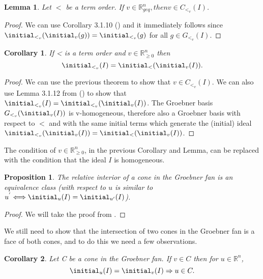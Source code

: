 \documentclass[12pt,a4paper]{report}
\newtheorem{corollary}{Corollary}
\newtheorem{lemma}{Lemma}
\newtheorem{proposition}{Proposition}
\begin{document}
\begin{lemma}
Let $<$ be a term order. If $v \in \mathbb{R}_{geq}^{n}, then v \in C_{{<}_{v}} (I)$.
\end{lemma}


\begin{proof}
We can use Corollary 3.1.10 (\cite{AndersPHD}) and it immediately follows since $\initial_{{<}_{v}} (\initial_{v} (g)) = \initial_{{<}_{v}} (g)$ for all $g \in G_{{<}_{v}} (I)$.
\end{proof}

\begin{corollary}
If < is a term order and $v \in \mathbb{R}_{\geq 0} ^{n}$ then
\begin{equation*}
    \initial_{{<}_{v}} (I) = \initial_{<} (\initial_{v} (I)).
\end{equation*}
\end{corollary}

\begin{proof}
We can use the previous theorem to show that $v \in C_{{<}_{v}} (I)$. We can also use Lemma 3.1.12 from (\cite{AndersPHD}) to show that $\initial_{{<}_{v}} (I) = \initial_{{<}_{v}} (\initial_{v} (I))$. The Groebner basis $G_{{<}_{v}} (\initial_{v}(I))$ is v-homogeneous, therefore also a Groebner basis with respect to $<$ and with the same initial terms which generate the (initial) ideal $\initial_{{<}_{v}} (\initial_{v} (I)) = \initial_{<} (\initial_{v} (I))$.
\end{proof}

The condition of $v \in \mathbb{R}_{\geq 0}^{n}$, in the previous Corollary and Lemma, can be replaced with the condition that the ideal $I$ is homogeneous.

\begin{proposition}
The relative interior of a cone in the Groebner fan is an equivalence class (with respect to $u$ is similar to $u^{'} \Longleftrightarrow \initial_{u} (I) = \initial_{u'} (I)$).
\end{proposition}

\begin{proof}
We will take the proof from \cite{AndersPHD}.
\end{proof}

We still need to show that the intersection of two cones in the Groebner fan is a face of both cones, and to do this we need a few observations.

\begin{corollary}
Let C be a cone in the Groebner fan. If $v \in C$ then for $u \in \mathbb{R}^{n}$,
\begin{equation*}
    \initial_{u} (I) = \initial_{v} (I) \Rightarrow u \in C.
\end{equation*}
\end{corollary}
\end{document}
